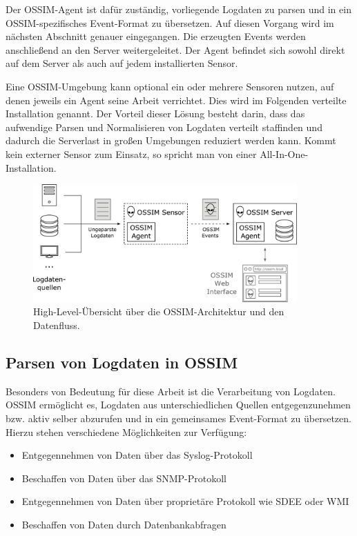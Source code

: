 Der OSSIM-Agent ist dafür zuständig, vorliegende Logdaten zu parsen und in ein OSSIM-spezifisches Event-Format zu übersetzen. Auf diesen Vorgang wird im nächsten Abschnitt genauer eingegangen. Die erzeugten Events werden anschließend an den Server weitergeleitet. Der Agent befindet sich sowohl direkt auf dem Server als auch auf jedem installierten Sensor. 

Eine OSSIM-Umgebung kann optional ein oder mehrere Sensoren nutzen, auf denen jeweils ein Agent seine Arbeit verrichtet. Dies wird im Folgenden verteilte Installation genannt. Der Vorteil dieser Lösung besteht darin, dass das aufwendige Parsen und Normalisieren von Logdaten verteilt staffinden und dadurch die Serverlast in großen Umgebungen reduziert werden kann. Kommt kein externer Sensor zum Einsatz, so spricht man von einer All-In-One-Installation.

\begin{figure}[]
    \centering
        \includegraphics[width=0.9\textwidth]{dia/ossim_log_flow.pdf}
    \caption{High-Level-Übersicht über die OSSIM-Architektur und den Datenfluss.}
    \label{fig:ossim_log_flow}
\end{figure}


\subsection{Parsen von Logdaten in OSSIM}

\label{subsec_state_siem_parsing}

Besonders von Bedeutung für diese Arbeit ist die Verarbeitung von Logdaten. OSSIM ermöglicht es, Logdaten aus unterschiedlichen Quellen entgegenzunehmen bzw. aktiv selber abzurufen und in ein gemeinsames Event-Format zu übersetzen. Hierzu stehen verschiedene Möglichkeiten zur Verfügung:

\begin{itemize}
  \item Entgegennehmen von Daten über das Syslog-Protokoll
  \item Beschaffen von Daten über das SNMP-Protokoll
  \item Entgegennehmen von Daten über proprietäre Protokoll wie SDEE oder WMI
  \item Beschaffen von Daten durch Datenbankabfragen 
\end{itemize}

